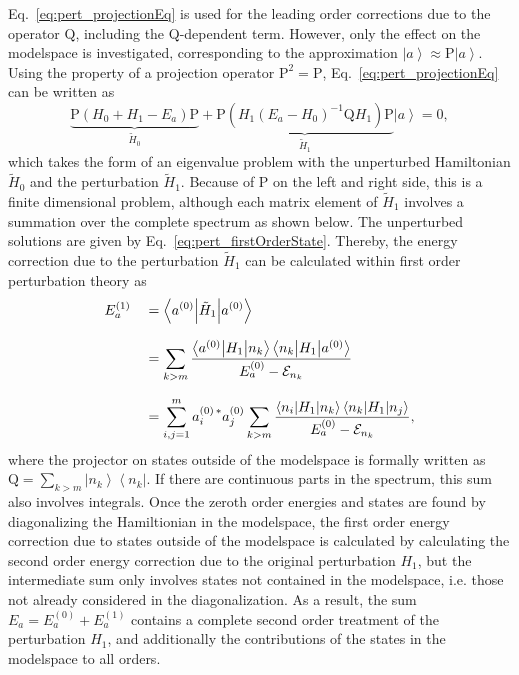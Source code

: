 Eq.~\eqref{eq:pert_projectionEq} is used for the leading order corrections due to the operator $\text{Q}$, including the Q-dependent term. However, only the effect on the modelspace is investigated, corresponding to the approximation $\left|a\right> \approx \text{P}\left|a\right>$. Using the property of a projection operator $\text{P}^2=\text{P}$, Eq.~\eqref{eq:pert_projectionEq} can be written as
\begin{equation}
\label{eq:pert_secondOrder}
 \underbrace{\text{P}(H_0+H_1-E_a)\text{P}}_{\tilde{H}_0} + \underbrace{\text{P}(H_1(E_a-H_0)^{-1}\text{Q}H_1)\text{P}}_{\tilde{H}_1} \left|a\right> = 0,
\end{equation}
which takes the form of an eigenvalue problem with the unperturbed Hamiltonian $\tilde{H}_0$ and the perturbation $\tilde{H}_1$. Because of $\text{P}$ on the left and right side, this is a finite dimensional problem, although each matrix element of $\tilde{H}_1$ involves a summation over the complete spectrum as shown below. The unperturbed solutions are given by Eq.~\eqref{eq:pert_firstOrderState}. Thereby, the energy correction due to the perturbation $\tilde{H}_1$ can be calculated within first order perturbation theory as
\begin{alignat}{2}
\label{eq:pert_secondOrderEnerg}
&E_a^{(1)}&&= \left<a^{(0)} \middle| \tilde{H}_1 \middle| a^{(0)} \right>\\[7.5pt]
& &&= \sum_{k>m} \frac{\left<a^{(0)}\middle|H_1\middle|n_k\right>\left<n_k\middle|H_1\middle|a^{(0)}\right>}{E_a^{(0)}-\mathcal{E}_{n_k}}\\[7.5pt]
& &&= \sum_{i,j=1}^m a_i^{(0)\,*}a_j^{(0)} \sum_{k>m} \frac{\left<n_i\middle|H_1\middle|n_k\right>\left<n_k\middle|H_1\middle|n_j\right>}{E_a^{(0)}-\mathcal{E}_{n_k}}\notag,
\end{alignat}
where the projector on states outside of the modelspace is formally written as $\text{Q}=\sum_{k>m}\left|n_k\right>\left<n_k\right|$. If there are continuous parts in the spectrum, this sum also involves integrals. Once the zeroth order energies and states are found by diagonalizing the Hamiltionian in the modelspace, the first order energy correction due to states outside of the modelspace is calculated by calculating the second order energy correction due to the original perturbation $H_1$, but the intermediate sum only involves states not contained in the modelspace, i.e. those not already considered in the diagonalization. As a result, the sum $E_a = E_a^{(0)}+E_a^{(1)}$ contains a complete second order treatment of the perturbation $H_1$, and additionally the contributions of the states in the modelspace to all orders.

